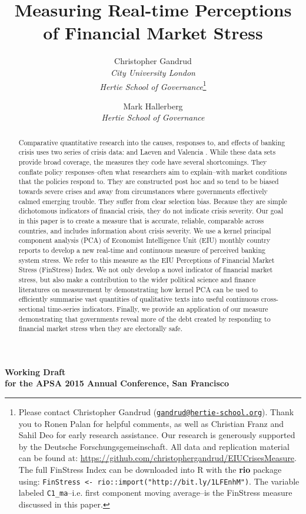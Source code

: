 \documentclass[]{article}
\title{Measuring Real-time Perceptions of Financial Market Stress}
\author{Christopher Gandrud \\ \emph{City University London} \\ \emph{Hertie School of Governance}\footnote{Please contact Christopher Gandrud
(\href{mailto:gandrud@hertie-school.org}{\nolinkurl{gandrud@hertie-school.org}}).
Thank you to Ronen Palan for helpful comments, as well as Christian Franz and Sahil Deo for early research assistance. Our research is generously supported by the Deutsche Forschungsgemeinschaft. All data and replication material can be found at:
\url{https://github.com/christophergandrud/EIUCrisesMeasure}. The full FinStress Index can be downloaded into R with the \textbf{rio} package using: \texttt{FinStress <- rio::import("http://bit.ly/1LFEnhM")}. The variable labeled \texttt{C1\_ma}--i.e. first component moving average--is the FinStress measure discussed in this paper.}
\and
Mark Hallerberg \\ \emph{Hertie School of Governance}}
\begin{document}
\maketitle

\begin{center}
    \textbf{Working Draft \\ for the APSA 2015 Annual Conference, San Francisco}
\end{center}

\begin{abstract}
    Comparative quantitative research into the causes, responses to, and effects of banking crisis uses two series of crisis data: \cite{Reinhart2009,ReinhartRog2010} and Laeven and Valencia \citeyearpar[and their predecessors]{laeven2013}. While these data sets provide broad coverage, the measures they code have several shortcomings. They conflate policy responses--often what researchers aim to explain--with market conditions that the policies respond to. They are constructed post hoc and so tend to be biased towards severe crises and away from circumstances where governments effectively calmed emerging trouble. They suffer from clear selection bias. Because they are simple dichotomous indicators of financial crisis, they do not indicate crisis severity. Our goal in this paper is to create a measure that is accurate, reliable, comparable across countries, and includes information about crisis severity. We use a kernel principal component analysis (PCA) of Economist Intelligence Unit (EIU) monthly country reports to develop a new real-time and continuous measure of perceived banking system stress. We refer to this measure as the EIU Perceptions of Financial Market Stress (FinStress) Index. We not only develop a novel indicator of financial market stress, but also make a contribution to the wider political science and finance literatures on measurement by demonstrating how kernel PCA can be used to efficiently summarise vast quantities of qualitative texts into useful continuous cross-sectional time-series indicators. Finally, we provide an application of our measure demonstrating that governments reveal more of the debt created by responding to financial market stress when they are electorally safe.

\end{abstract}
\end{document}
